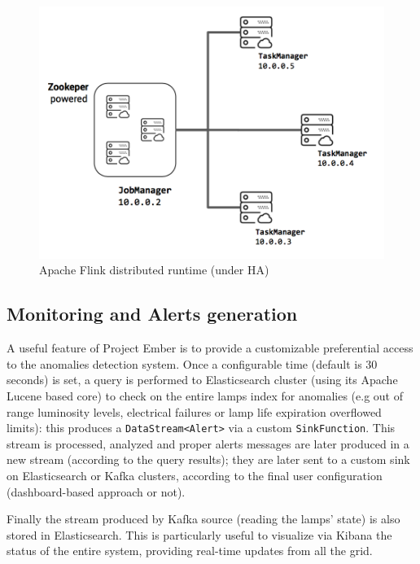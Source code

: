 \begin{figure}[!b]
\begin{center}
	\includegraphics[scale=0.40]{img/ember_ha}
	\caption{Apache Flink distributed runtime (under HA)}
	\label{fig:ember_ha}
\end{center}
\end{figure}

\subsection*{Monitoring and Alerts generation}
A useful feature of Project Ember is to provide a customizable preferential access to the anomalies detection system. Once a configurable time (default is 30 seconds) is set, a query is performed to Elasticsearch cluster (using its Apache Lucene based core) to check on the entire lamps index for anomalies (e.g out of range luminosity levels, electrical failures or lamp life expiration overflowed limits): this produces a \texttt{DataStream<Alert>} via a custom \texttt{SinkFunction}. This stream is processed, analyzed and proper alerts messages are later produced in a new stream (according to the query results); they are later sent to a custom sink on Elasticsearch or Kafka clusters, according to the final user configuration (dashboard-based approach or not).

Finally the stream produced by Kafka source (reading the lamps' state) is also stored in Elasticsearch. This is particularly useful to visualize via Kibana the status of the entire system, providing real-time updates from all the grid. 

